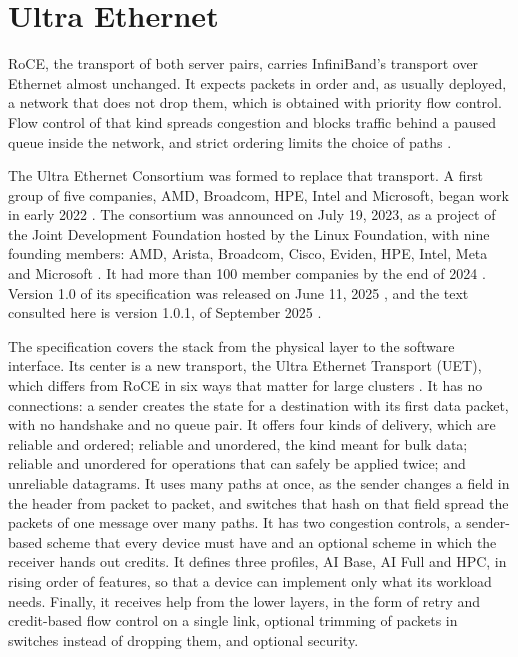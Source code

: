 \section{Ultra Ethernet}
\label{sec:uec}

RoCE, the transport of both server pairs, carries InfiniBand's
transport over Ethernet almost unchanged. It expects packets in order and, as
usually deployed, a network that does not drop them, which is obtained with
priority flow control. Flow control of that kind spreads congestion and
blocks traffic behind a paused queue inside the network, and strict ordering
limits the choice of paths \citep{hoefler2025ue}.

The Ultra Ethernet Consortium was formed to replace that transport. A first
group of five companies, AMD, Broadcom, HPE, Intel and Microsoft, began work
in early 2022 \citep{hoefler2025ue}. The consortium was announced on July 19,
2023, as a project of the Joint Development Foundation hosted by the Linux
Foundation, with nine founding members: AMD, Arista, Broadcom, Cisco, Eviden,
HPE, Intel, Meta and Microsoft \citep{uec2023launch}. It had more than 100
member companies by the end of 2024 \citep{hoefler2025ue}. Version 1.0 of its specification was released on June 11, 2025
\citep{uec2025spec10}, and the text consulted here is version 1.0.1, of
September 2025 \citep{uecspec}.

The specification covers the stack from the physical layer to the software
interface. Its center is a new transport, the Ultra Ethernet Transport (UET),
which differs from RoCE in six ways that matter for large clusters
\citep{hoefler2025ue,uecspec,xiong2025ofaue}. It has no connections: a
sender creates the state for a destination with its first data packet, with
no handshake and no queue pair. It offers four kinds of delivery, which are
reliable and ordered; reliable and unordered, the kind meant for bulk data;
reliable and unordered for operations that can safely be applied twice; and
unreliable datagrams. It uses many paths at once, as the sender changes a
field in the header from packet to packet, and switches that hash on that
field spread the packets of one message over many paths. It has two
congestion controls, a sender-based scheme that every device must have and an
optional scheme in which the receiver hands out credits. It defines three
profiles, AI Base, AI Full and HPC, in rising order of features, so that a
device can implement only what its workload needs. Finally, it receives help
from the lower layers, in the form of retry and credit-based flow control on
a single link, optional trimming of packets in switches instead of dropping
them, and optional security.

